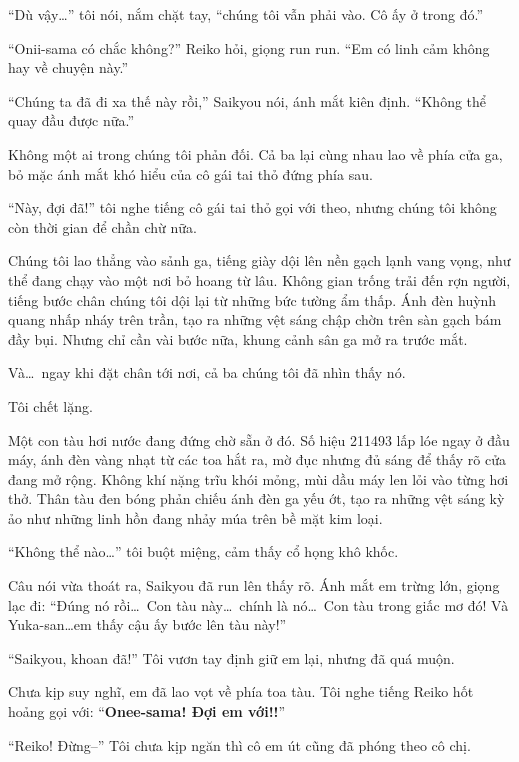 \documentclass[../main.tex]{subfiles}
\begin{document}
``Dù vậy\dots'' tôi nói, nắm chặt tay, ``chúng tôi vẫn phải vào. Cô ấy ở trong đó.''

``Onii-sama có chắc không?'' Reiko hỏi, giọng run run. ``Em có linh cảm không hay về chuyện này.''

``Chúng ta đã đi xa thế này rồi,'' Saikyou nói, ánh mắt kiên định. ``Không thể quay đầu được nữa.''

Không một ai trong chúng tôi phản đối. Cả ba lại cùng nhau lao về phía cửa ga, bỏ mặc ánh mắt khó hiểu của cô gái tai thỏ đứng phía sau.

``Này, đợi đã!'' tôi nghe tiếng cô gái tai thỏ gọi với theo, nhưng chúng tôi không còn thời gian để chần chừ nữa.

\ct

Chúng tôi lao thẳng vào sảnh ga, tiếng giày dội lên nền gạch lạnh vang vọng, như thể đang chạy vào một nơi bỏ hoang từ lâu. Không gian trống trải đến rợn người, tiếng bước chân chúng tôi dội lại từ những bức tường ẩm thấp. Ánh đèn huỳnh quang nhấp nháy trên trần, tạo ra những vệt sáng chập chờn trên sàn gạch bám đầy bụi. Nhưng chỉ cần vài bước nữa, khung cảnh sân ga mở ra trước mắt.

Và\dots\ ngay khi đặt chân tới nơi, cả ba chúng tôi đã nhìn thấy nó.


Tôi chết lặng.

Một con tàu hơi nước đang đứng chờ sẵn ở đó. Số hiệu 211493 lấp lóe ngay ở đầu máy, ánh đèn vàng nhạt từ các toa hắt ra, mờ đục nhưng đủ sáng để thấy rõ cửa đang mở rộng. Không khí nặng trĩu khói mỏng, mùi dầu máy len lỏi vào từng hơi thở. Thân tàu đen bóng phản chiếu ánh đèn ga yếu ớt, tạo ra những vệt sáng kỳ ảo như những linh hồn đang nhảy múa trên bề mặt kim loại.

``Không thể nào\dots''  tôi buột miệng, cảm thấy cổ họng khô khốc.

Câu nói vừa thoát ra, Saikyou đã run lên thấy rõ. Ánh mắt em trừng lớn, giọng lạc đi: ``Đúng nó rồi\dots\ Con tàu này\dots\ chính là nó\dots\ Con tàu trong giấc mơ đó! Và Yuka-san\dots em thấy cậu ấy bước lên tàu này!''

``Saikyou, khoan đã!'' Tôi vươn tay định giữ em lại, nhưng đã quá muộn.

Chưa kịp suy nghĩ, em đã lao vọt về phía toa tàu. Tôi nghe tiếng Reiko hốt hoảng gọi với: ``\textbf{Onee-sama! Đợi em với!!}''

``Reiko! Đừng--'' Tôi chưa kịp ngăn thì cô em út cũng đã phóng theo cô chị.
\end{document}
